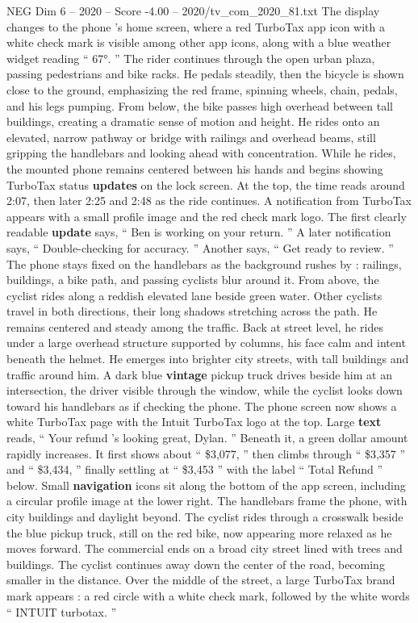 \begin{textsample}{NEG Dim 6 – 2020 – Score -4.00 – 2020/tv\_com\_2020\_81.txt}
The display changes to the phone ’s home screen, where a red TurboTax app icon with a white check mark is visible among other app icons, along with a blue weather widget reading “ 67{\EmojiFont °}. ” The rider continues through the open urban plaza, passing pedestrians and bike racks.
He pedals steadily, then the bicycle is shown close to the ground, emphasizing the red frame, spinning wheels, chain, pedals, and his legs pumping.
From below, the bike passes high overhead between tall buildings, creating a dramatic sense of motion and height.
He rides onto an elevated, narrow pathway or bridge with railings and overhead beams, still gripping the handlebars and looking ahead with concentration.
While he rides, the mounted phone remains centered between his hands and begins showing TurboTax status \textbf{updates} on the lock screen.
At the top, the time reads around 2:07, then later 2:25 and 2:48 as the ride continues.
A notification from TurboTax appears with a small profile image and the red check mark logo.
The first clearly readable \textbf{update} says, “ Ben is working on your return. ” A later notification says, “ Double-checking for accuracy. ” Another says, “ Get ready to review. ” The phone stays fixed on the handlebars as the background rushes by : railings, buildings, a bike path, and passing cyclists blur around it.
From above, the cyclist rides along a reddish elevated lane beside green water.
Other cyclists travel in both directions, their long shadows stretching across the path.
He remains centered and steady among the traffic.
Back at street level, he rides under a large overhead structure supported by columns, his face calm and intent beneath the helmet.
He emerges into brighter city streets, with tall buildings and traffic around him.
A dark blue \textbf{vintage} pickup truck drives beside him at an intersection, the driver visible through the window, while the cyclist looks down toward his handlebars as if checking the phone.
The phone screen now shows a white TurboTax page with the Intuit TurboTax logo at the top.
Large \textbf{text} reads, “ Your refund ’s looking great, Dylan. ” Beneath it, a green dollar amount rapidly increases.
It first shows about “ \$3,077, ” then climbs through “ \$3,357 ” and “ \$3,434, ” finally settling at “ \$3,453 ” with the label “ Total Refund ” below.
Small \textbf{navigation} icons sit along the bottom of the app screen, including a circular profile image at the lower right.
The handlebars frame the phone, with city buildings and daylight beyond.
The cyclist rides through a crosswalk beside the blue pickup truck, still on the red bike, now appearing more relaxed as he moves forward.
The commercial ends on a broad city street lined with trees and buildings.
The cyclist continues away down the center of the road, becoming smaller in the distance.
Over the middle of the street, a large TurboTax brand mark appears : a red circle with a white check mark, followed by the white words “ INTUIT turbotax. ”

\end{textsample}
